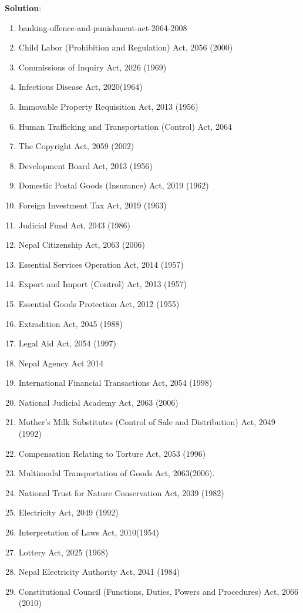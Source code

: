 \documentclass[
  openany]{book}
\newenvironment{solution}{ {\bfseries Solution}:}{}
\begin{document}
\begin{questions}
\begin{solution}
\begin{enumerate}
\item banking-offence-and-punishment-act-2064-2008
\item Child Labor (Prohibition and Regulation) Act, 2056 (2000)
\item Commissions of Inquiry Act, 2026 (1969)
\item Infectious Disease Act, 2020(1964)
\item Immovable Property Requisition Act, 2013 (1956)
\item Human Trafficking and Transportation (Control) Act, 2064
\item The Copyright Act, 2059 (2002)
\item Development Board Act, 2013 (1956)
\item Domestic Postal Goods (Insurance) Act, 2019 (1962)
\item Foreign Investment Tax Act, 2019 (1963)
\item Judicial Fund Act, 2043 (1986)
\item Nepal Citizenship Act, 2063 (2006)
\item Essential Services Operation Act, 2014 (1957)
\item Export and Import (Control) Act, 2013 (1957)
\item Essential Goods Protection Act, 2012 (1955)
\item Extradition Act, 2045 (1988)
\item Legal Aid Act, 2054 (1997)
\item Nepal Agency Act 2014
\item International Financial Transactions Act, 2054 (1998)
\item National Judicial Academy Act, 2063 (2006)
\item Mother's Milk Substitutes (Control of Sale and Distribution) Act, 2049 (1992)
\item Compensation Relating to Torture Act, 2053 (1996)
\item Multimodal Transportation of Goods Act, 2063(2006).
\item National Trust for Nature Conservation Act, 2039 (1982)
\item Electricity Act, 2049 (1992)
\item Interpretation of Laws Act, 2010(1954)
\item Lottery Act, 2025 (1968)
\item Nepal Electricity Authority Act, 2041 (1984)
\item Constitutional Council (Functions, Duties, Powers and Procedures) Act, 2066 (2010)

\end{enumerate}
\end{solution}
\end{questions}
\end{document}
